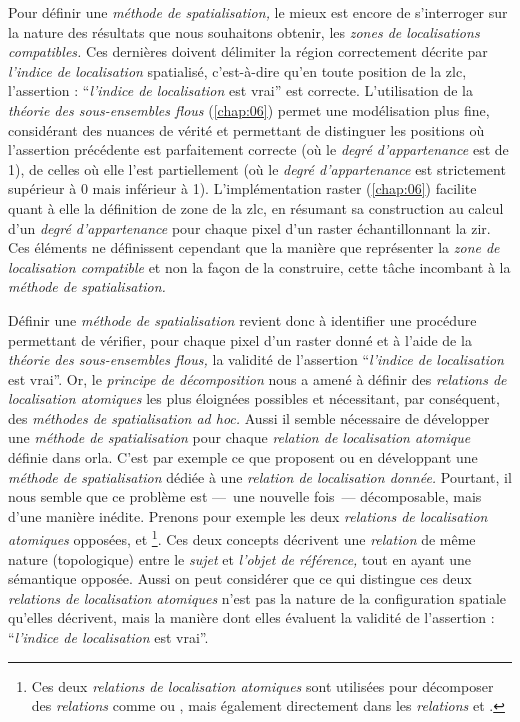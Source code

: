 Pour définir une \emph{méthode de spatialisation,} le mieux est encore de s’interroger sur la nature des résultats que nous souhaitons obtenir, les \emph{zones de localisations compatibles.} Ces dernières doivent délimiter la région correctement décrite par \emph{l'indice de localisation} spatialisé, c'est-à-dire qu'en toute position de la \ac{zlc}, l'assertion : \enquote{\emph{l'indice de localisation} est vrai} est correcte. L'utilisation de la \emph{théorie des sous-ensembles flous} (\autoref{chap:06}) permet une modélisation plus fine, considérant des nuances de vérité et permettant de distinguer les positions où l'assertion précédente est parfaitement correcte (\ie où le \emph{degré d'appartenance} est de 1), de celles où elle l'est partiellement (\ie où le \emph{degré d'appartenance} est strictement supérieur à 0 mais inférieur à 1). L'implémentation raster (\autoref{chap:06}) facilite quant à elle la définition de zone de la \ac{zlc}, en résumant sa construction au calcul d'un \emph{degré d'appartenance} pour chaque pixel d'un raster échantillonnant la \ac{zir}. Ces éléments ne définissent cependant que la manière que représenter la \emph{zone de localisation compatible} et non la façon de la construire, cette tâche incombant à la \emph{méthode de spatialisation.}

Définir une \emph{méthode de spatialisation} revient donc à identifier une procédure permettant de vérifier, pour chaque pixel d'un raster donné et à l'aide de la \emph{théorie des sous-ensembles flous,} la validité de l'assertion \enquote{\emph{l'indice de localisation} est vrai}. Or, le \emph{principe de décomposition} nous a amené à définir des \emph{relations de localisation atomiques} les plus éloignées possibles et nécessitant, par conséquent, des \emph{méthodes de spatialisation ad hoc.} Aussi il semble nécessaire de développer une \emph{méthode de spatialisation} pour chaque \emph{relation de localisation atomique} définie dans \ac{orla}. C'est par exemple ce que proposent \textcite{Vanegas2011} ou \textcite{Takemura2012} en développant une \emph{méthode de spatialisation} dédiée à une \emph{relation de localisation donnée.} Pourtant, il nous semble que ce problème est ---~une nouvelle fois~--- décomposable, mais d'une manière inédite. Prenons pour exemple les deux \emph{relations de localisation atomiques} opposées,  et  \footnote{Ces deux \emph{relations de localisation atomiques} sont utilisées pour décomposer des \emph{relations} comme \protect{} ou \protect{}, mais également directement dans les \emph{relations} \protect{} et \protect{}.}. Ces deux concepts décrivent une \emph{relation} de même nature (\ie topologique) entre le \emph{sujet} et \emph{l'objet de référence,} tout en ayant une sémantique opposée.
%
Aussi on peut considérer que ce qui distingue ces deux \emph{relations de localisation atomiques} n'est pas la nature de la configuration spatiale qu'elles décrivent, mais la manière dont elles évaluent la validité de l'assertion : \enquote{\emph{l'indice de localisation} est vrai}.

